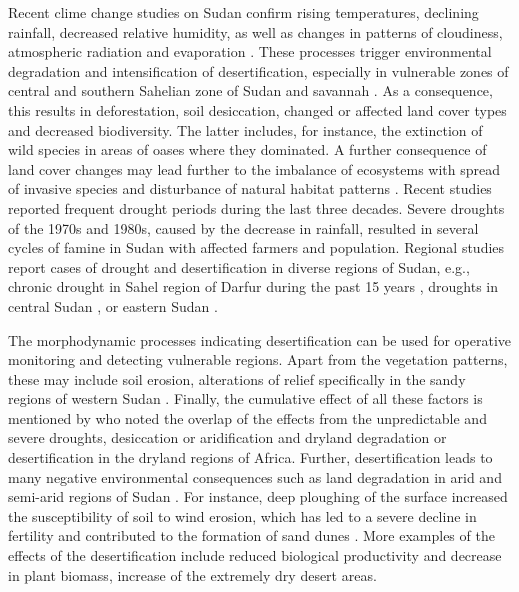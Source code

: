 \documentclass[jimaging,article,submit,pdftex,moreauthors]{Definitions/mdpi}
\begin{document}
Recent clime change studies on Sudan confirm rising temperatures, declining rainfall, decreased relative humidity, as well as changes in patterns of cloudiness, atmospheric radiation and evaporation \cite{Alvi}. These processes trigger environmental degradation and intensification of desertification, especially in vulnerable zones of central and southern Sahelian zone of Sudan \cite{Pearce,YANG2022106213} and savannah \cite{Falkenmark}. As a consequence, this results in deforestation, soil desiccation, changed or affected land cover types \cite{Biro} and decreased biodiversity. The latter includes, for instance, the extinction of wild species in areas of oases where they dominated. A further consequence of land cover changes may lead further to the imbalance of ecosystems with spread of invasive species \cite{insects10110405} and disturbance of natural habitat patterns \cite{Fuller}. Recent studies reported \cite{SALIH2017S31} frequent drought periods during the last three decades. Severe droughts of the 1970s and 1980s, caused by the decrease in rainfall, resulted in several cycles of famine in Sudan with affected farmers and population. Regional studies report cases of drought and desertification in diverse regions of Sudan, e.g., chronic drought in Sahel region of Darfur during the past 15 years \cite{FULLER198739}, droughts in central Sudan \cite{Salih2022}, or eastern Sudan \cite{TARIKU2021144863,SULIEMAN2012132}. 

The morphodynamic processes indicating desertification can be used for operative monitoring and detecting vulnerable regions. Apart from the vegetation patterns, these may include soil erosion, alterations of relief specifically in the sandy regions of western Sudan \cite{Bakhit}. Finally, the cumulative effect of all these factors is mentioned by \cite{Darkoh} who noted the overlap of the effects from the unpredictable and severe droughts, desiccation or aridification and dryland degradation or desertification in the dryland regions of Africa. Further, desertification leads to many negative environmental consequences such as land degradation in arid and semi-arid regions of Sudan \cite{Khiry,ELNASHAR2022152925}. For instance, deep ploughing of the surface increased the susceptibility of soil to wind erosion, which has led to a severe decline in fertility and contributed to the formation of sand dunes \cite{Abdi}. More examples of the effects of the desertification include reduced biological productivity \cite{KHALIFA2018790,Jahelnabi} and decrease in plant biomass, increase of the extremely dry desert areas. 
\end{document}

